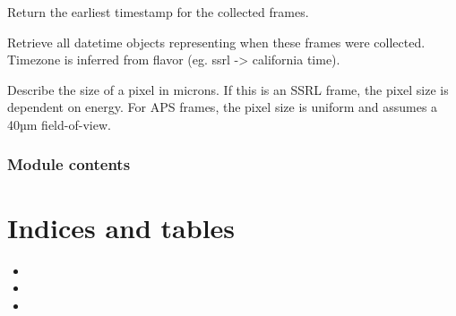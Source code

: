 \documentclass[letterpaper,10pt,english]{sphinxmanual}
\begin{document}
\begin{fulllineitems}

\begin{fulllineitems}
\label{\detokenize{xanespy:xanespy.xradia.XRMFile.starttime}}
Return the earliest timestamp for the collected frames.

\end{fulllineitems}


\begin{fulllineitems}
\label{\detokenize{xanespy:xanespy.xradia.XRMFile.starttimes}}
Retrieve all datetime objects representing when these frames were
collected. Timezone is inferred from flavor (eg. ssrl -\textgreater{}
california time).

\end{fulllineitems}


\begin{fulllineitems}
\label{\detokenize{xanespy:xanespy.xradia.XRMFile.um_per_pixel}}
Describe the size of a pixel in microns. If this is an SSRL frame,
the pixel size is dependent on energy. For APS frames, the pixel size
is uniform and assumes a 40µm field-of-view.

\end{fulllineitems}


\end{fulllineitems}



\subsection{Module contents}
\label{\detokenize{xanespy:module-contents}}\label{\detokenize{xanespy:module-xanespy}}

\chapter{Indices and tables}
\label{\detokenize{index:indices-and-tables}}\begin{itemize}
\item {} 

\item {} 

\item {} 

\end{itemize}
\end{document}

